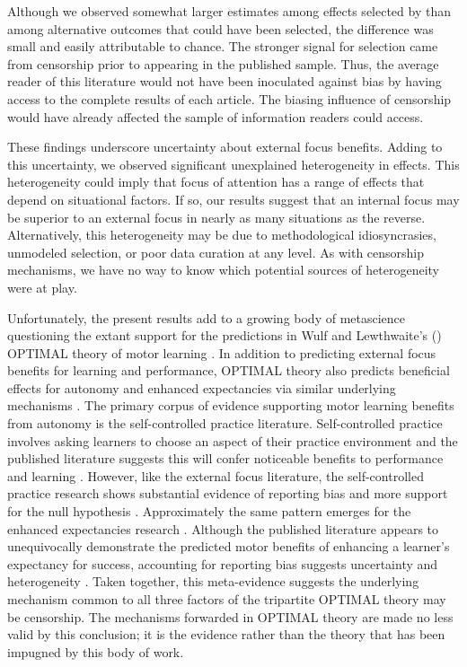 \documentclass[man,floatsintext,letterpaper,12pt]{apa7}
\begin{document}
Although we observed somewhat larger estimates among effects selected by \textcite{chua2021} than among alternative outcomes that could have been selected, the difference was small and easily attributable to chance. The stronger signal for selection came from censorship prior to appearing in the published sample. Thus, the average reader of this literature would not have been inoculated against bias by having access to the complete results of each article. The biasing influence of censorship would have already affected the sample of information readers could access.

These findings underscore uncertainty about external focus benefits. Adding to this uncertainty, we observed significant unexplained heterogeneity in effects. This heterogeneity could imply that focus of attention has a range of effects that depend on situational factors. If so, our results suggest that an internal focus may be superior to an external focus in nearly as many situations as the reverse. Alternatively, this heterogeneity may be due to methodological idiosyncrasies, unmodeled selection, or poor data curation at any level. As with censorship mechanisms, we have no way to know which potential sources of heterogeneity were at play.

Unfortunately, the present results add to a growing body of metascience questioning the extant support for the predictions in Wulf and Lewthwaite's (\citeyear{wulf2016}) OPTIMAL theory of motor learning \autocite[see][for a recent meta-analysis on the other two pillars in the theory]{mckay2023}. In addition to predicting external focus benefits for learning and performance, OPTIMAL theory also predicts beneficial effects for autonomy and enhanced expectancies via similar underlying mechanisms \autocite{wulf2016}. The primary corpus of evidence supporting motor learning benefits from autonomy is the self-controlled practice literature. Self-controlled practice involves asking learners to choose an aspect of their practice environment and the published literature suggests this will confer noticeable benefits to performance and learning \autocite[for a review see][]{stemarie2020}. However, like the external focus literature, the self-controlled practice research shows substantial evidence of reporting bias and more support for the null hypothesis \autocite{mckay2022b}. Approximately the same pattern emerges for the enhanced expectancies research \autocite{bacelar2022b}. Although the published literature appears to unequivocally demonstrate the predicted motor benefits of enhancing a learner's expectancy for success, accounting for reporting bias suggests uncertainty and heterogeneity \autocite{mckay2023}. Taken together, this meta-evidence suggests the underlying mechanism common to all three factors of the tripartite OPTIMAL theory may be censorship. The mechanisms forwarded in OPTIMAL theory are made no less valid by this conclusion; it is the evidence rather than the theory that has been impugned by this body of work.\footnotemark{}
\end{document}
